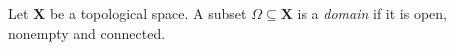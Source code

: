 \begin{definition}[Domain]
Let $\mathbf X$ be a topological space. A subset $\Omega\subseteq \mathbf X$ is a \emph{domain} if it is open, nonempty and connected.
\end{definition}
